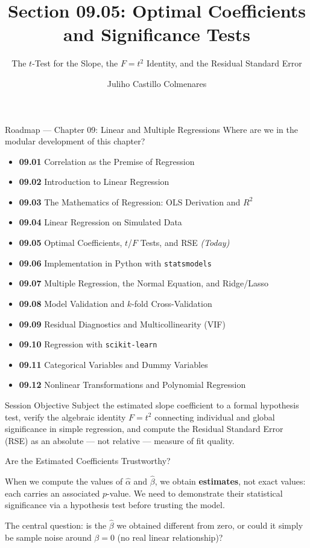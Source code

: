 \documentclass[10pt, aspectratio=169]{beamer}
\title[Optimal Coefficients]{Section 09.05: Optimal Coefficients and Significance Tests}
\subtitle{The $t$-Test for the Slope, the $F=t^2$ Identity, and the Residual Standard Error}
\author[J. Castillo Colmenares]{Juliho Castillo Colmenares}
\institute{Tecnológico de Monterrey}
\date{\vspace{-1.5cm}}
\begin{document}
\begin{frame}[plain]
  \titlepage
\end{frame}

\begin{frame}{Roadmap --- Chapter 09: Linear and Multiple Regressions}
  \scriptsize
  Where are we in the modular development of this chapter?
  \begin{itemize}\itemsep=0.02em
    \item \textbf{09.01} Correlation as the Premise of Regression
    \item \textbf{09.02} Introduction to Linear Regression
    \item \textbf{09.03} The Mathematics of Regression: OLS Derivation and $R^2$
    \item \textbf{09.04} Linear Regression on Simulated Data
    \item \textbf{09.05} Optimal Coefficients, $t$/$F$ Tests, and RSE \emph{(Today)}
    \item \textbf{09.06} Implementation in Python with \texttt{statsmodels}
    \item \textbf{09.07} Multiple Regression, the Normal Equation, and Ridge/Lasso
    \item \textbf{09.08} Model Validation and $k$-fold Cross-Validation
    \item \textbf{09.09} Residual Diagnostics and Multicollinearity (VIF)
    \item \textbf{09.10} Regression with \texttt{scikit-learn}
    \item \textbf{09.11} Categorical Variables and Dummy Variables
    \item \textbf{09.12} Nonlinear Transformations and Polynomial Regression
  \end{itemize}
  \pause
  \vspace{-0.05cm}
  \begin{block}{Session Objective}
    Subject the estimated slope coefficient to a formal hypothesis test, verify the algebraic identity $F=t^2$ connecting individual and global significance in simple regression, and compute the Residual Standard Error (RSE) as an absolute --- not relative --- measure of fit quality.
  \end{block}
\end{frame}

\begin{frame}{Are the Estimated Coefficients Trustworthy?}
  \footnotesize
  \begin{motivacion}
    When we compute the values of $\hat\alpha$ and $\hat\beta$, we obtain \textbf{estimates}, not exact values: each carries an associated $p$-value. We need to demonstrate their statistical significance via a hypothesis test before trusting the model.
  \end{motivacion}

  \vspace{0.15cm}
  \pause
  The central question: is the $\hat\beta$ we obtained different from zero, or could it simply be sample noise around $\beta=0$ (no real linear relationship)?
\end{frame}
\end{document}
